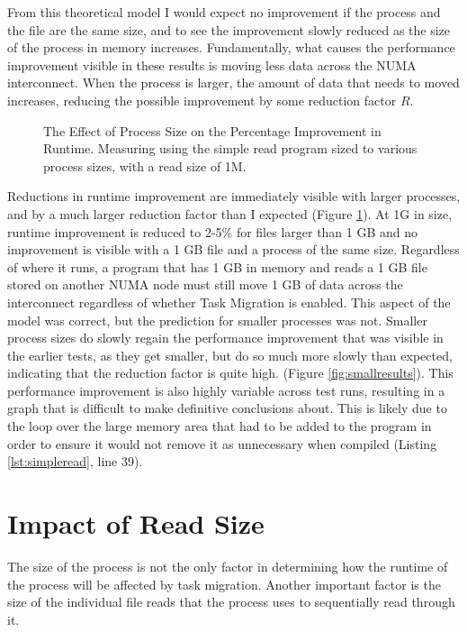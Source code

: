 From this theoretical model I would expect no improvement if the process and the file are the same size, 
and to see the improvement slowly reduced as the size of the process in memory increases.
Fundamentally, what causes the performance improvement visible in these results is moving less data across the NUMA interconnect.
When the process is larger, the amount of data that needs to moved increases, reducing the possible improvement by some reduction factor $R$.

\begin{figure}[H]
    \centering
    \resizebox{0.75\linewidth}{!}{}
    \captionsetup{width=0.75\linewidth}
    \caption{The Effect of Process Size on the Percentage Improvement in Runtime.
        Measuring using the simple read program sized to various process sizes, with a read size of 1M.}
    \label{fig:ProcessSize}
\end{figure}

Reductions in runtime improvement are immediately visible with larger processes, and by a much larger reduction factor than I expected 
(Figure \ref{fig:ProcessSize}).
At 1G in size, runtime improvement is reduced to 2-5\% for files larger than 1 GB
and no improvement is visible with a 1 GB file and a process of the same size.
Regardless of where it runs, a program that has 1 GB in memory and reads a 1 GB file stored on another NUMA node
must still move 1 GB of data across the interconnect regardless of whether Task Migration is enabled.
This aspect of the model was correct, but the prediction for smaller processes was not.
Smaller process sizes do slowly regain the performance improvement that was visible in the earlier tests,
as they get smaller, but do so much more slowly than expected, indicating that the reduction factor is quite high.
(Figure \ref{fig:smallresults}).
This performance improvement is also highly variable across test runs, resulting in a graph that is difficult
to make definitive conclusions about.
This is likely due to the loop over the large memory area that had to be added to the program in order to
ensure it would not remove it as unnecessary when compiled (Listing \ref{lst:simpleread}, line 39).

\section{Impact of Read Size}
\label{chapter:readsizeimpact}
The size of the process is not the only factor in determining how the runtime of the process will be affected by task migration.
Another important factor is the size of the individual file reads that the process uses to sequentially read through it.

